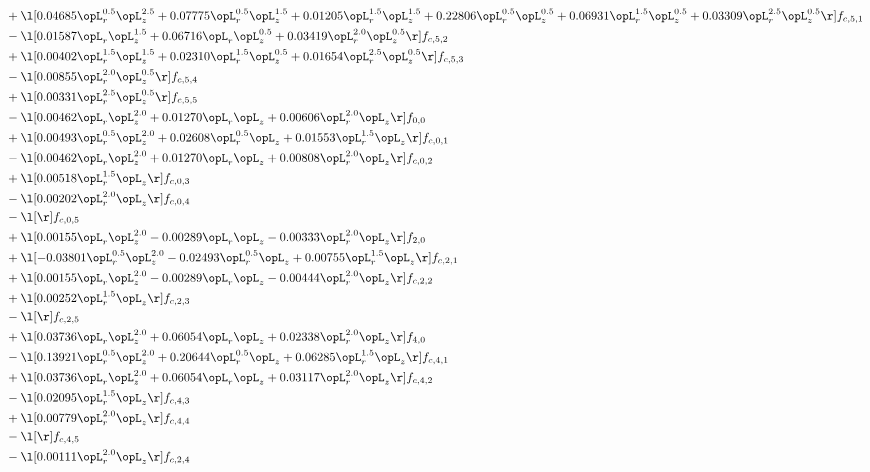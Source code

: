 \begin{alignat}{2}
& + \l[  0.04685 \opL_r^{0.5} \opL_z^{2.5} +  0.07775 \opL_r^{0.5} \opL_z^{1.5} +  0.01205 \opL_r^{1.5} \opL_z^{1.5} +  0.22806 \opL_r^{0.5} \opL_z^{0.5} +  0.06931 \opL_r^{1.5} \opL_z^{0.5} +  0.03309 \opL_r^{2.5} \opL_z^{0.5}  \r] f_{c,5,1} \nonumber \\ 
& - \l[  0.01587 \opL_r \opL_z^{1.5} +  0.06716 \opL_r \opL_z^{0.5} +  0.03419 \opL_r^{2.0} \opL_z^{0.5}  \r] f_{c,5,2} \nonumber \\ 
& + \l[  0.00402 \opL_r^{1.5} \opL_z^{1.5} +  0.02310 \opL_r^{1.5} \opL_z^{0.5} +  0.01654 \opL_r^{2.5} \opL_z^{0.5}  \r] f_{c,5,3} \nonumber \\ 
& - \l[  0.00855 \opL_r^{2.0} \opL_z^{0.5}  \r] f_{c,5,4} \nonumber \\ 
& + \l[  0.00331 \opL_r^{2.5} \opL_z^{0.5}  \r] f_{c,5,5} \nonumber \\ 
& - \l[  0.00462 \opL_r \opL_z^{2.0} +  0.01270 \opL_r \opL_z +  0.00606 \opL_r^{2.0} \opL_z  \r] f_{0,0} \nonumber \\ 
& + \l[  0.00493 \opL_r^{0.5} \opL_z^{2.0} +  0.02608 \opL_r^{0.5} \opL_z +  0.01553 \opL_r^{1.5} \opL_z  \r] f_{c,0,1} \nonumber \\ 
& - \l[  0.00462 \opL_r \opL_z^{2.0} +  0.01270 \opL_r \opL_z +  0.00808 \opL_r^{2.0} \opL_z  \r] f_{c,0,2} \nonumber \\ 
& + \l[  0.00518 \opL_r^{1.5} \opL_z  \r] f_{c,0,3} \nonumber \\ 
& - \l[  0.00202 \opL_r^{2.0} \opL_z  \r] f_{c,0,4} \nonumber \\ 
& - \l[  \r] f_{c,0,5} \nonumber \\ 
& + \l[  0.00155 \opL_r \opL_z^{2.0}   -0.00289 \opL_r \opL_z   -0.00333 \opL_r^{2.0} \opL_z  \r] f_{2,0} \nonumber \\ 
& + \l[  -0.03801 \opL_r^{0.5} \opL_z^{2.0}   -0.02493 \opL_r^{0.5} \opL_z +  0.00755 \opL_r^{1.5} \opL_z  \r] f_{c,2,1} \nonumber \\ 
& + \l[  0.00155 \opL_r \opL_z^{2.0}   -0.00289 \opL_r \opL_z   -0.00444 \opL_r^{2.0} \opL_z  \r] f_{c,2,2} \nonumber \\ 
& + \l[  0.00252 \opL_r^{1.5} \opL_z  \r] f_{c,2,3} \nonumber \\ 
& - \l[  \r] f_{c,2,5} \nonumber \\ 
& + \l[  0.03736 \opL_r \opL_z^{2.0} +  0.06054 \opL_r \opL_z +  0.02338 \opL_r^{2.0} \opL_z  \r] f_{4,0} \nonumber \\ 
& - \l[  0.13921 \opL_r^{0.5} \opL_z^{2.0} +  0.20644 \opL_r^{0.5} \opL_z +  0.06285 \opL_r^{1.5} \opL_z  \r] f_{c,4,1} \nonumber \\ 
& + \l[  0.03736 \opL_r \opL_z^{2.0} +  0.06054 \opL_r \opL_z +  0.03117 \opL_r^{2.0} \opL_z  \r] f_{c,4,2} \nonumber \\ 
& - \l[  0.02095 \opL_r^{1.5} \opL_z  \r] f_{c,4,3} \nonumber \\ 
& + \l[  0.00779 \opL_r^{2.0} \opL_z  \r] f_{c,4,4} \nonumber \\ 
& - \l[  \r] f_{c,4,5} \nonumber \\ 
& - \l[  0.00111 \opL_r^{2.0} \opL_z  \r] f_{c,2,4} \nonumber \\ 
\end{alignat} 


